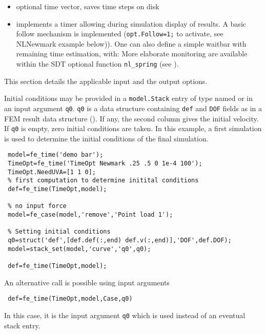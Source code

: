 \begin{itemize}
\item {}   optional time vector, saves time steps on disk

\item {}   implements a timer allowing during simulation display of results. A basic follow mechanism is implemented ({\tt opt.Follow=1;} to activate, see NLNewmark example below)). One can also define a simple waitbar with remaining time estimation, with: 
More elaborate monitoring are available within the SDT optional function {\tt nl\_spring} (see  ).

\end{itemize}



This section details the applicable input and the output options.

Initial conditions may be provided in a {\tt model.Stack} entry of type  named  or in an input argument {\tt q0}. 
{\tt q0} is a data structure containing {\tt def} and {\tt DOF} fields as in a FEM result data structure (). 
If any, the second column gives the initial velocity. If {\tt q0} is empty, zero initial conditions are taken.
In this example, a first simulation is used to determine the initial conditions of the final simulation.

\begin{verbatim}
 model=fe_time('demo bar');
 TimeOpt=fe_time('TimeOpt Newmark .25 .5 0 1e-4 100');
 TimeOpt.NeedUVA=[1 1 0];
 % first computation to determine initital conditions
 def=fe_time(TimeOpt,model); 

 % no input force
 model=fe_case(model,'remove','Point load 1');

 % Setting initial conditions
 q0=struct('def',[def.def(:,end) def.v(:,end)],'DOF',def.DOF);
 model=stack_set(model,'curve','q0',q0);

 def=fe_time(TimeOpt,model); 
\end{verbatim}%


An alternative call is possible using input arguments 
\begin{verbatim}
 def=fe_time(TimeOpt,model,Case,q0) 
\end{verbatim}


In this case, it is the input argument {\tt q0} which is used instead of an eventual stack entry.


